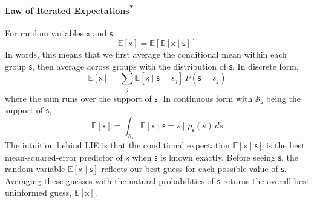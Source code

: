 \paragraph*{\texorpdfstring{Law of Iterated Expectations\textsuperscript{*}}{Law of Iterated Expectations}}
For random variables $\mathsf{x}$ and $\mathsf{s}$,
\begin{equation}
  \mathbb{E}[\mathsf{x}] = \mathbb{E}\left[\mathbb{E}[\mathsf{x}\mid \mathsf{s}]\right]
  \label{eq:lie}
\end{equation}
In words, this means that we first average the conditional mean within each group $\mathsf{s}$, then average across groups with the distribution of $\mathsf{s}$. In discrete form,
\begin{equation}
  \mathbb{E}[\mathsf{x}]=\sum_j \mathbb{E}\left[\mathsf{x}\mid \mathsf{s}=s_j\right]\,P(\mathsf{s}=s_j)
\end{equation}
where the sum runs over the support of $\mathsf{s}$. In continuous form with $\mathcal{S}_\mathsf{s}$ being the support of $\mathsf{s}$,
\begin{equation}
  \mathbb{E}[\mathsf{x}]=\int_{\mathcal{S}_\mathsf{s}} \mathbb{E}\left[\mathsf{x}\mid \mathsf{s}=s\right]\,p_{\mathsf{s}}(s)\,ds
\end{equation}
The intuition behind LIE is that the conditional expectation $\mathbb{E}[\mathsf{x}\mid \mathsf{s}]$ is the best mean-squared-error predictor of $\mathsf{x}$ when $\mathsf{s}$ is known exactly. Before seeing $\mathsf{s}$, the random variable $\mathbb{E}[\mathsf{x}\mid \mathsf{s}]$ reflects our best guess for each possible value of $\mathsf{s}$. Averaging these guesses with the natural probabilities of $\mathsf{s}$ returns the overall best uninformed guess, $\mathbb{E}[\mathsf{x}]$.


